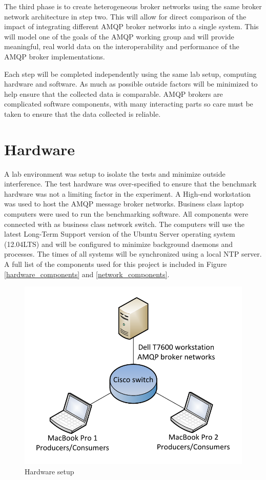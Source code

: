 \documentclass{thesis}
\begin{document}
The third phase is to create heterogeneous broker networks using the same broker network architecture in step two.  This will allow for direct comparison of the impact of integrating different AMQP broker networks into a single system.  This will model one of the goals of the AMQP working group and will provide meaningful, real world data on the interoperability and performance of the AMQP broker implementations. 

Each step will be completed independently using the same lab setup, computing hardware and software.  As much as possible outside factors will be minimized to help ensure that the collected data is comparable.  AMQP brokers are complicated software components, with many interacting parts so care must be taken to ensure that the data collected is reliable.  

\section{Hardware}
A lab environment was setup to isolate the tests and minimize outside interference.  The test hardware was over-specified to ensure that the benchmark hardware was not a limiting factor in the experiment.  A High-end workstation was used to host the AMQP message broker networks.  Business class laptop computers were used to run the benchmarking software.  All components were connected with as business class network switch.  The computers will use the latest Long-Term Support version of the Ubuntu Server operating system (12.04LTS) and will be configured to minimize background daemons and processes.  The times of all systems will be synchronized using a local NTP server.  A full list of the components used for this project is included in Figure \ref{hardware_components} and \ref{network_components}.

\begin{figure}[h]
\centering
\includegraphics{test_setup_2}  
\caption{Hardware setup}
\end{figure}
\end{document}
